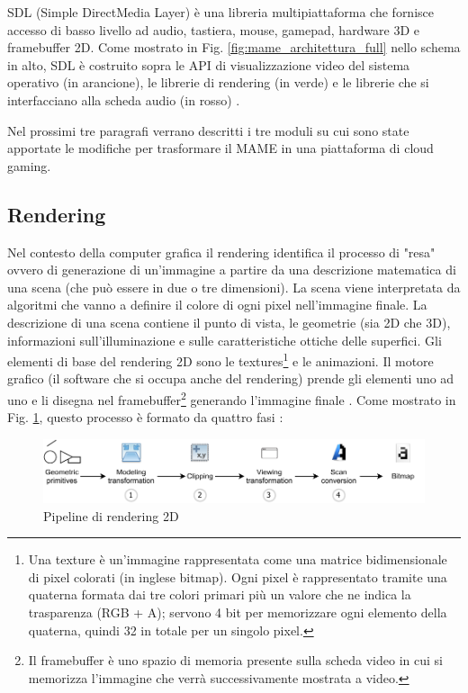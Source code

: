 SDL (Simple DirectMedia Layer) è una libreria multipiattaforma che fornisce accesso di basso livello ad audio, tastiera, mouse, gamepad, hardware 3D e framebuffer 2D. Come mostrato in Fig. \ref{fig:mame_architettura_full} nello schema in alto, SDL è costruito sopra le API di visualizzazione video del sistema operativo (in arancione), le librerie di rendering (in verde) e le librerie che si interfacciano alla scheda audio (in rosso) \parencite{SDL_Wiki}.

Nel prossimi tre paragrafi verrano descritti i tre moduli su cui sono state apportate le modifiche per trasformare il MAME in una piattaforma di cloud gaming.




\subsection{Rendering}
Nel contesto della computer grafica il rendering identifica il processo di "resa" ovvero di generazione di un'immagine a partire da una descrizione matematica di una scena (che può essere in due o tre dimensioni). La scena viene interpretata da algoritmi che vanno a definire il colore di ogni pixel nell'immagine finale. La descrizione di una scena contiene il punto di vista, le geometrie (sia 2D che 3D), informazioni sull'illuminazione e sulle caratteristiche ottiche delle superfici. Gli elementi di base del rendering 2D sono le textures\footnote{Una texture è un'immagine rappresentata come una matrice bidimensionale di pixel colorati (in inglese bitmap). Ogni pixel è rappresentato tramite una quaterna formata dai tre colori primari più un valore che ne indica la trasparenza (RGB + A); servono 4 bit per memorizzare ogni elemento della quaterna, quindi 32 in totale per un singolo pixel.} e le animazioni. Il motore grafico (il software che si occupa anche del rendering) prende gli elementi uno ad uno e li disegna nel framebuffer\footnote{Il framebuffer è uno spazio di memoria presente sulla scheda video in cui si memorizza l'immagine che verrà successivamente mostrata a video.} generando l'immagine finale \parencite{Efficient_2D_software_rendering}. Come mostrato in Fig. \ref{fig:rendering_pipeline}, questo processo è formato da quattro fasi \parencite{Computer_Vision_A_Modern_Approach}:

\begin{figure}[H]
	\includegraphics[width=\linewidth]{immagini/rendering_pipeline}
	\caption{Pipeline di rendering 2D}
	\label{fig:rendering_pipeline}
\end{figure}

